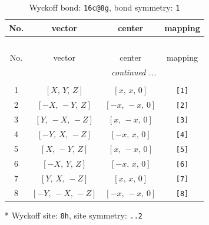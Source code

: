 \documentclass[fleqn,8pt]{jsarticle}
\begin{document}
\renewcommand{\arraystretch}{1.2}
\begin{longtable}{cccc}
\caption{Wyckoff bond: {\tt 16c@8g}, bond symmetry: {\tt 1}}
 \\
 \hline \hline
No. & vector & center & mapping \\ \hline \endfirsthead

\multicolumn{3}{l}{\tablename\ \thetable{}} \\
 \hline \hline
No. & vector & center & mapping \\ \hline \endhead

 \hline \hline
\multicolumn{3}{r}{\footnotesize\it continued ...} \\ \endfoot

 \hline \hline
\multicolumn{3}{r}{} \\ \endlastfoot

1 & $\left[ X,\, Y,\, Z \right]$ & $\left[ x,\, x,\, 0 \right]$ & {\tt [1]} \\ \hline
2 & $\left[ - X,\, - Y,\, Z \right]$ & $\left[ - x,\, - x,\, 0 \right]$ & {\tt [2]} \\ \hline
3 & $\left[ Y,\, - X,\, - Z \right]$ & $\left[ x,\, - x,\, 0 \right]$ & {\tt [3]} \\ \hline
4 & $\left[ - Y,\, X,\, - Z \right]$ & $\left[ - x,\, x,\, 0 \right]$ & {\tt [4]} \\ \hline
5 & $\left[ X,\, - Y,\, Z \right]$ & $\left[ x,\, - x,\, 0 \right]$ & {\tt [5]} \\ \hline
6 & $\left[ - X,\, Y,\, Z \right]$ & $\left[ - x,\, x,\, 0 \right]$ & {\tt [6]} \\ \hline
7 & $\left[ Y,\, X,\, - Z \right]$ & $\left[ x,\, x,\, 0 \right]$ & {\tt [7]} \\ \hline
8 & $\left[ - Y,\, - X,\, - Z \right]$ & $\left[ - x,\, - x,\, 0 \right]$ & {\tt [8]} \\
\end{longtable}
* Wyckoff site: {\tt 8h}, site symmetry: {\tt ..2}
\renewcommand{\arraystretch}{1.2}
\end{document}
